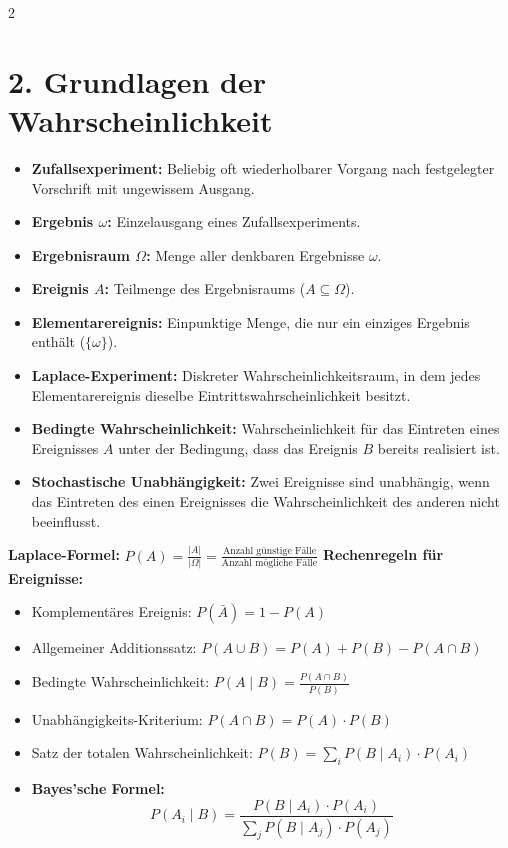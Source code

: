 \documentclass[a4paper, 9pt]{extarticle}
\begin{document}
\begin{multicols*}{2}
\section*{2. Grundlagen der Wahrscheinlichkeit}

\begin{tcolorbox}[title={Theorie-Stichworte: Wahrscheinlichkeit}, colframe=probgreen, colback=probgreen!5, colbacktitle=probgreen]
\begin{itemize}
    \item \textbf{Zufallsexperiment:} Beliebig oft wiederholbarer Vorgang nach festgelegter Vorschrift mit ungewissem Ausgang.
    \item \textbf{Ergebnis $\omega$:} Einzelausgang eines Zufallsexperiments.
    \item \textbf{Ergebnisraum $\Omega$:} Menge aller denkbaren Ergebnisse $\omega$.
    \item \textbf{Ereignis $A$:} Teilmenge des Ergebnisraums ($A \subseteq \Omega$).
    \item \textbf{Elementarereignis:} Einpunktige Menge, die nur ein einziges Ergebnis enthält ($\{\omega\}$).
    \item \textbf{Laplace-Experiment:} Diskreter Wahrscheinlichkeitsraum, in dem jedes Elementarereignis dieselbe Eintrittswahrscheinlichkeit besitzt.
    \item \textbf{Bedingte Wahrscheinlichkeit:} Wahrscheinlichkeit für das Eintreten eines Ereignisses $A$ unter der Bedingung, dass das Ereignis $B$ bereits realisiert ist.
    \item \textbf{Stochastische Unabhängigkeit:} Zwei Ereignisse sind unabhängig, wenn das Eintreten des einen Ereignisses die Wahrscheinlichkeit des anderen nicht beeinflusst.
\end{itemize}
\end{tcolorbox}

\begin{tcolorbox}[title={Axiome, Rechenregeln \& Sätze}, colframe=probgreen, colback=probgreen!5, colbacktitle=probgreen]
\textbf{Laplace-Formel:} $P(A) = \frac{|A|}{|\Omega|} = \frac{\text{Anzahl günstige Fälle}}{\text{Anzahl mögliche Fälle}}$
\smallskip
\textbf{Rechenregeln für Ereignisse:}
\begin{itemize}
    \item Komplementäres Ereignis: $P(\bar{A}) = 1 - P(A)$
    \item Allgemeiner Additionssatz: $P(A \cup B) = P(A) + P(B) - P(A \cap B)$
    \item Bedingte Wahrscheinlichkeit: $P(A \mid B) = \frac{P(A \cap B)}{P(B)}$
    \item Unabhängigkeits-Kriterium: $P(A \cap B) = P(A) \cdot P(B)$
    \item Satz der totalen Wahrscheinlichkeit: $P(B) = \sum_{i} P(B \mid A_i) \cdot P(A_i)$
    \item \textbf{Bayes'sche Formel:}
    $$P(A_i \mid B) = \frac{P(B \mid A_i) \cdot P(A_i)}{\sum_{j} P(B \mid A_j) \cdot P(A_j)}$$
\end{itemize}
\end{tcolorbox}


\end{multicols*}
\end{document}
